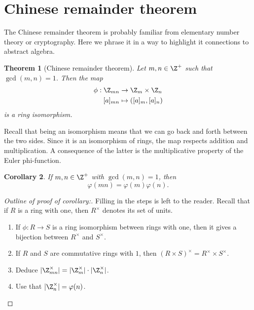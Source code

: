 \documentclass[12pt]{amsart}
\theoremstyle{plain}
\newtheorem{thm}{Theorem}[section]
\newtheorem{cor}[thm]{Corollary}
\theoremstyle{definition}
\theoremstyle{remark}
\begin{document}
\section{Chinese remainder theorem}
The Chinese remainder theorem is probably familiar from elementary
number theory or cryptography.  Here we phrase it in a way to
highlight it connections to abstract algebra.
\begin{thm}[Chinese remainder theorem] \label{crt}
  Let $m,n\in\Z^+$ such that $\gcd(m,n)=1$.  Then the map
  \begin{align*}
    \phi:\Z_{mn}&\to \Z_m\times\Z_n \\
    [a]_{mn} &\mapsto ([a]_m, [a]_n)
  \end{align*}
  is a ring isomorphism.
\end{thm}
Recall that being an isomorphism means that we can go back and forth
between the two sides.  Since it is an isomorphism of rings, the map
respects addition and multiplication.  A consequence of the latter is
the multiplicative property of the Euler phi-function.
\begin{cor}
  If $m,n\in\Z^+$ with $\gcd(m,n)=1$, then
  \[ \varphi(mn) = \varphi(m)\varphi(n).\]
\end{cor}
\begin{proof}[Outline of proof of corollary:]
Filling in the steps is left to the reader.  Recall that if $R$ is a
ring with one, then $R^\times$ denotes its set of units.
\begin{enumerate}
  \item If $\phi:R\to S$ is a ring isomorphism between rings with one,
    then it gives a bijection between $R^\times$ and $S^\times$.
  \item If $R$ and $S$ are commutative rings with $1$, then $(R\times
    S)^\times =R^\times\times S^\times$.
  \item Deduce $|\Z_{mn}^\times| = |\Z_m^\times|\cdot |\Z_n^\times|$.
  \item Use that $|\Z_n^\times| = \varphi(n)$.
\end{enumerate}
\end{proof}
\end{document}
